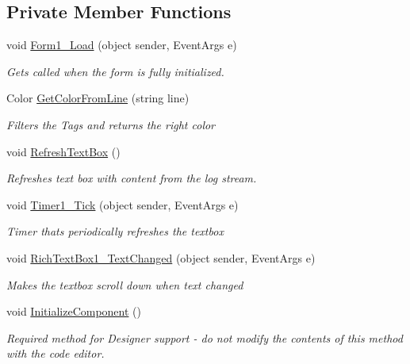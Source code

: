\subsection*{Private Member Functions}
\begin{DoxyCompactItemize}
\item 
void \mbox{\hyperlink{class_a_d_l_1_1_custom_c_m_d_1_1_custom_c_m_d_form_a62b5a9eb917413e8195182107598101c}{Form1\+\_\+\+Load}} (object sender, Event\+Args e)
\begin{DoxyCompactList}\small\item\em Gets called when the form is fully initialized. \end{DoxyCompactList}\item 
Color \mbox{\hyperlink{class_a_d_l_1_1_custom_c_m_d_1_1_custom_c_m_d_form_a56aa8bfb57e4b8efd06ed59d20917665}{Get\+Color\+From\+Line}} (string line)
\begin{DoxyCompactList}\small\item\em Filters the Tags and returns the right color \end{DoxyCompactList}\item 
void \mbox{\hyperlink{class_a_d_l_1_1_custom_c_m_d_1_1_custom_c_m_d_form_a81dfe3dc03b1651dd3590f951914f6a8}{Refresh\+Text\+Box}} ()
\begin{DoxyCompactList}\small\item\em Refreshes text box with content from the log stream. \end{DoxyCompactList}\item 
void \mbox{\hyperlink{class_a_d_l_1_1_custom_c_m_d_1_1_custom_c_m_d_form_a9afd93546e1a02adc1b48040a244ae79}{Timer1\+\_\+\+Tick}} (object sender, Event\+Args e)
\begin{DoxyCompactList}\small\item\em Timer thats periodically refreshes the textbox \end{DoxyCompactList}\item 
void \mbox{\hyperlink{class_a_d_l_1_1_custom_c_m_d_1_1_custom_c_m_d_form_a041972edde1f897d5c72122eeaee4bb0}{Rich\+Text\+Box1\+\_\+\+Text\+Changed}} (object sender, Event\+Args e)
\begin{DoxyCompactList}\small\item\em Makes the textbox scroll down when text changed \end{DoxyCompactList}\item 
void \mbox{\hyperlink{class_a_d_l_1_1_custom_c_m_d_1_1_custom_c_m_d_form_afd8906303127f25f0767d62a7126d958}{Initialize\+Component}} ()
\begin{DoxyCompactList}\small\item\em Required method for Designer support -\/ do not modify the contents of this method with the code editor. \end{DoxyCompactList}\end{DoxyCompactItemize}
